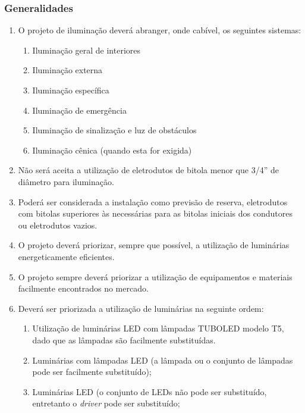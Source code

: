 \subsubsection{Generalidades} \label{lighting - generalidades}

\begin{enumerate}
	
	\item O projeto de iluminação deverá abranger, onde cabível, os seguintes sistemas:
	\begin{enumerate}
		\item Iluminação geral de interiores
		\item Iluminação externa
		\item Iluminação específica
		\item Iluminação de emergência
		\item Iluminação de sinalização e luz de obstáculos
		\item Iluminação cênica (quando esta for exigida)
	\end{enumerate}
	
	\item Não será aceita a utilização de eletrodutos de bitola menor que 3/4” de diâmetro para iluminação.
	
	\item Poderá ser considerada a instalação como previsão de reserva, eletrodutos com bitolas superiores às necessárias para as bitolas iniciais dos condutores ou eletrodutos vazios.
	
	\item O projeto deverá priorizar, sempre que possível, a utilização de luminárias energeticamente eficientes.
	
	\item O projeto sempre deverá priorizar a utilização de equipamentos e materiais facilmente encontrados no mercado.
	
	\item Deverá ser priorizada a utilização de luminárias na seguinte ordem:\label{light: tipo1}
	\begin{enumerate}
		\item Utilização de luminárias LED com lâmpadas TUBOLED modelo T5, dado que as lâmpadas são facilmente substituídas.

		\item Luminárias com lâmpadas LED (a lâmpada ou o conjunto de lâmpadas pode ser facilmente substituído);
		
		\item Luminárias LED (o conjunto de LEDs não pode ser substituído, entretanto o \textit{driver} pode ser substituído;
	\end{enumerate}


\end{enumerate}
